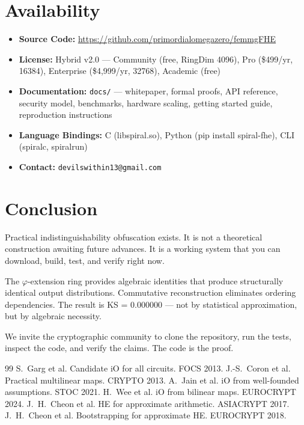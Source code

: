 \documentclass[11pt,a4paper]{article}
\begin{document}
\section{Availability}

\begin{itemize}
\item \textbf{Source Code:} \url{https://github.com/primordialomegazero/femmgFHE}
\item \textbf{License:} Hybrid v2.0 --- Community (free, RingDim 4096), Pro (\$499/yr, 16384), Enterprise (\$4,999/yr, 32768), Academic (free)
\item \textbf{Documentation:} \texttt{docs/} --- whitepaper, formal proofs, API reference, security model, benchmarks, hardware scaling, getting started guide, reproduction instructions
\item \textbf{Language Bindings:} C (libspiral.so), Python (pip install spiral-fhe), CLI (spiralc, spiralrun)
\item \textbf{Contact:} \texttt{devilswithin13@gmail.com}
\end{itemize}

\section{Conclusion}

Practical indistinguishability obfuscation exists. It is not a theoretical construction awaiting future advances. It is a working system that you can download, build, test, and verify right now.

The $\varphi$-extension ring provides algebraic identities that produce structurally identical output distributions. Commutative reconstruction eliminates ordering dependencies. The result is KS = 0.000000 --- not by statistical approximation, but by algebraic necessity.

We invite the cryptographic community to clone the repository, run the tests, inspect the code, and verify the claims. The code is the proof.

\begin{thebibliography}{99}
 S.~Garg et al. Candidate iO for all circuits. FOCS 2013.
 J.-S.~Coron et al. Practical multilinear maps. CRYPTO 2013.
 A.~Jain et al. iO from well-founded assumptions. STOC 2021.
 H.~Wee et al. iO from bilinear maps. EUROCRYPT 2024.
 J.~H.~Cheon et al. HE for approximate arithmetic. ASIACRYPT 2017.
 J.~H.~Cheon et al. Bootstrapping for approximate HE. EUROCRYPT 2018.
\end{thebibliography}
\end{document}
